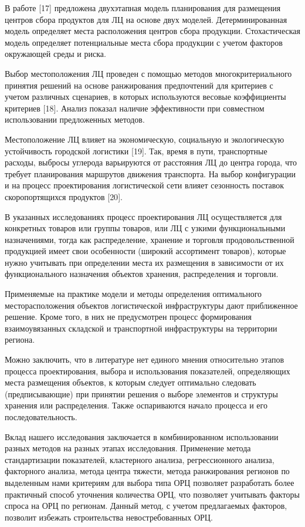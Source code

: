 \begin{multicols}{2}
В работе {[}17{]} предложена двухэтапная модель планирования для
размещения центров сбора продуктов для ЛЦ на основе двух моделей.
Детерминированная модель определяет места расположения центров сбора
продукции. Стохастическая модель определяет потенциальные места сбора
продукции с учетом факторов окружающей среды и риска.

Выбор местоположения ЛЦ проведен с помощью методов многокритериального
принятия решений на основе ранжирования предпочтений для критериев с
учетом различных сценариев, в которых используются весовые коэффициенты
критериев {[}18{]}. Анализ показал наличие эффективности при совместном
использовании предложенных методов.

Местоположение ЛЦ влияет на экономическую, социальную и экологическую
устойчивость городской логистики {[}19{]}. Так, время в пути,
транспортные расходы, выбросы углерода варьируются от расстояния ЛЦ до
центра города, что требует планирования маршрутов движения транспорта.
На выбор конфигурации и на процесс проектирования логистической сети
влияет сезонность поставок скоропортящихся продуктов {[}20{]}.

В указанных исследованиях процесс проектирования ЛЦ осуществляется для
конкретных товаров или группы товаров, или ЛЦ с узкими функциональными
назначениями, тогда как распределение, хранение и торговля
продовольственной продукцией имеет свои особенности (широкий ассортимент
товаров), которые нужно учитывать при определении места их размещения в
зависимости от их функционального назначения объектов хранения,
распределения и торговли.

Применяемые на практике модели и методы определения оптимального
месторасположения объектов логистической инфраструктуры дают
приближенное решение. Кроме того, в них не предусмотрен процесс
формирования взаимоувязанных складской и транспортной инфраструктуры на
территории региона.

Можно заключить, что в литературе нет единого мнения относительно этапов
процесса проектирования, выбора и использования показателей,
определяющих места размещения объектов, к которым следует оптимально
следовать (предписывающие) при принятии решения о выборе элементов и
структуры хранения или распределения. Также оспариваются начало процесса
и его последовательность.

Вклад нашего исследования заключается в комбинированном использовании
разных методов на разных этапах исследования. Применение метода
стандартизации показателей, кластерного анализа, регрессионного анализа,
факторного анализа, метода центра тяжести, метода ранжирования регионов
по выделенным нами критериям для выбора типа ОРЦ позволяет разработать
более практичный способ уточнения количества ОРЦ, что позволяет
учитывать факторы спроса на ОРЦ по регионам. Данный метод, с учетом
предлагаемых факторов, позволит избежать строительства невостребованных
ОРЦ.


\end{multicols}
